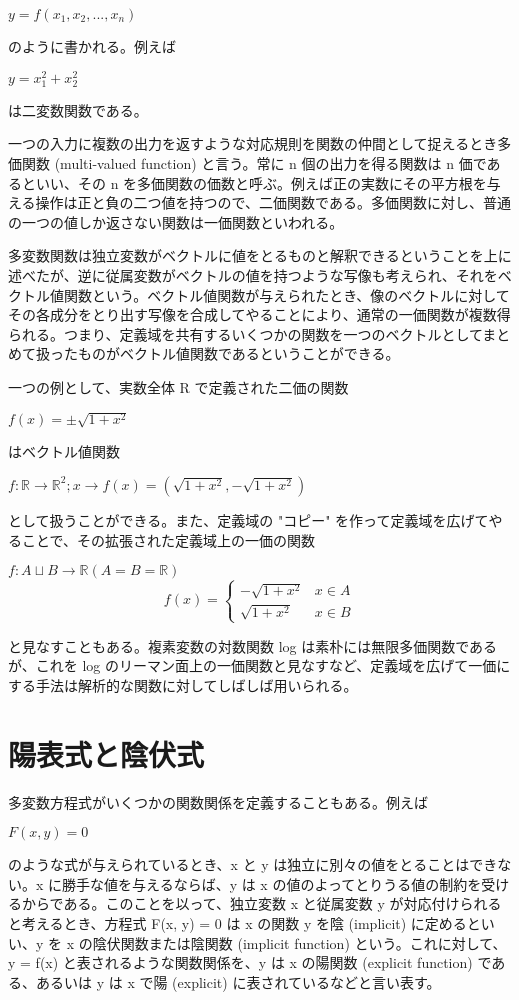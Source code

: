 \documentclass[a4j,12pt]{jreport}
\begin{document}
$y = f(x_1,x_2,...,x_n)$

のように書かれる。例えば

$y = x_1^2 + x_2^2$

は二変数関数である。

一つの入力に複数の出力を返すような対応規則を関数の仲間として捉えるとき多価関数 (multi-valued function) と言う。常に n 個の出力を得る関数は n 価であるといい、その n を多価関数の価数と呼ぶ。例えば正の実数にその平方根を与える操作は正と負の二つ値を持つので、二価関数である。多価関数に対し、普通の一つの値しか返さない関数は一価関数といわれる。

多変数関数は独立変数がベクトルに値をとるものと解釈できるということを上に述べたが、逆に従属変数がベクトルの値を持つような写像も考えられ、それをベクトル値関数という。ベクトル値関数が与えられたとき、像のベクトルに対してその各成分をとり出す写像を合成してやることにより、通常の一価関数が複数得られる。つまり、定義域を共有するいくつかの関数を一つのベクトルとしてまとめて扱ったものがベクトル値関数であるということができる。

一つの例として、実数全体 R で定義された二価の関数

$f(x) = \pm\sqrt{1+x^2}$

はベクトル値関数

$f:\mathbb{R} \to \mathbb{R}^2; x \to f(x) = ( \sqrt{1+x^2},-\sqrt{1+x^2})$

として扱うことができる。また、定義域の "コピー" を作って定義域を広げてやることで、その拡張された定義域上の一価の関数

$f:A \sqcup B \to \mathbb{R} (A = B = \mathbb{R})$
$$
f(x) = \begin{cases}
-\sqrt{1+x^2} & x \in A \\
\sqrt{1+x^2} & x \in B
\end{cases}
$$

と見なすこともある。複素変数の対数関数 log は素朴には無限多価関数であるが、これを log のリーマン面上の一価関数と見なすなど、定義域を広げて一価にする手法は解析的な関数に対してしばしば用いられる。



\chapter{陽表式と陰伏式}
多変数方程式がいくつかの関数関係を定義することもある。例えば

$F(x,y)=0$

のような式が与えられているとき、x と y は独立に別々の値をとることはできない。x に勝手な値を与えるならば、y は x の値のよってとりうる値の制約を受けるからである。このことを以って、独立変数 x と従属変数 y が対応付けられると考えるとき、方程式 F(x, y) = 0 は x の関数 y を陰 (implicit) に定めるといい、y を x の陰伏関数または陰関数 (implicit function) という。これに対して、y = f(x) と表されるような関数関係を、y は x の陽関数 (explicit function) である、あるいは y は x で陽 (explicit) に表されているなどと言い表す。
\end{document}
